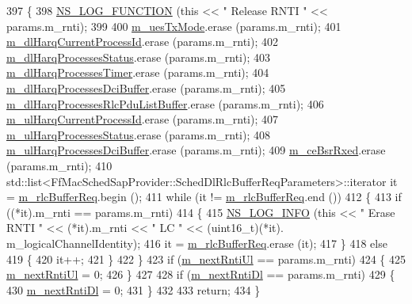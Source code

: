 \begin{DoxyCode}
397 \{
398   \hyperlink{log-macros-disabled_8h_a90b90d5bad1f39cb1b64923ea94c0761}{NS\_LOG\_FUNCTION} (\textcolor{keyword}{this} << \textcolor{stringliteral}{" Release RNTI "} << params.m\_rnti);
399   
400   \hyperlink{classns3_1_1RrFfMacScheduler_acaf305dd7717f4ced31f1dfc07df68ea}{m\_uesTxMode}.erase (params.m\_rnti);
401   \hyperlink{classns3_1_1RrFfMacScheduler_a1e8b17ba5e424b3d11c217b32c41faac}{m\_dlHarqCurrentProcessId}.erase (params.m\_rnti);
402   \hyperlink{classns3_1_1RrFfMacScheduler_aa3d12b5abcb9afeea093150a6572aaed}{m\_dlHarqProcessesStatus}.erase  (params.m\_rnti);
403   \hyperlink{classns3_1_1RrFfMacScheduler_ab5040cff67dad6c8fdfc9c32c90916df}{m\_dlHarqProcessesTimer}.erase (params.m\_rnti);
404   \hyperlink{classns3_1_1RrFfMacScheduler_a6611390f9589d1df0b0f4c0932219eeb}{m\_dlHarqProcessesDciBuffer}.erase  (params.m\_rnti);
405   \hyperlink{classns3_1_1RrFfMacScheduler_a2a6afd0a7df7a71c20382176f6cc9573}{m\_dlHarqProcessesRlcPduListBuffer}.erase  (params.m\_rnti);
406   \hyperlink{classns3_1_1RrFfMacScheduler_ad7674f8cb560202bc36a792f7b2755ca}{m\_ulHarqCurrentProcessId}.erase  (params.m\_rnti);
407   \hyperlink{classns3_1_1RrFfMacScheduler_a13fbe24878639869771e77ff813373ff}{m\_ulHarqProcessesStatus}.erase  (params.m\_rnti);
408   \hyperlink{classns3_1_1RrFfMacScheduler_a530849c4c8d3d5b0796e6af3d8d95173}{m\_ulHarqProcessesDciBuffer}.erase  (params.m\_rnti);
409   \hyperlink{classns3_1_1RrFfMacScheduler_a1696bc07e1fdc0336106223f97b44298}{m\_ceBsrRxed}.erase (params.m\_rnti);
410   std::list<FfMacSchedSapProvider::SchedDlRlcBufferReqParameters>::iterator it = 
      \hyperlink{classns3_1_1RrFfMacScheduler_a25a4bfbb928e22dc026209de004b90fd}{m\_rlcBufferReq}.begin ();
411   \textcolor{keywordflow}{while} (it != \hyperlink{classns3_1_1RrFfMacScheduler_a25a4bfbb928e22dc026209de004b90fd}{m\_rlcBufferReq}.end ())
412     \{
413       \textcolor{keywordflow}{if} ((*it).m\_rnti == params.m\_rnti)
414         \{
415           \hyperlink{group__logging_gafbd73ee2cf9f26b319f49086d8e860fb}{NS\_LOG\_INFO} (\textcolor{keyword}{this} << \textcolor{stringliteral}{" Erase RNTI "} << (*it).m\_rnti << \textcolor{stringliteral}{" LC "} << (uint16\_t)(*it).
      m\_logicalChannelIdentity);
416           it = \hyperlink{classns3_1_1RrFfMacScheduler_a25a4bfbb928e22dc026209de004b90fd}{m\_rlcBufferReq}.erase (it);
417         \}
418       \textcolor{keywordflow}{else}
419         \{
420           it++;
421         \}
422     \}
423   \textcolor{keywordflow}{if} (\hyperlink{classns3_1_1RrFfMacScheduler_afd1cdb17c29e2a04980e4bea7d537e0f}{m\_nextRntiUl} == params.m\_rnti)
424     \{
425       \hyperlink{classns3_1_1RrFfMacScheduler_afd1cdb17c29e2a04980e4bea7d537e0f}{m\_nextRntiUl} = 0;
426     \}
427 
428   \textcolor{keywordflow}{if} (\hyperlink{classns3_1_1RrFfMacScheduler_a7c5404bfe1ef2446a6e920a9d80a8f51}{m\_nextRntiDl} == params.m\_rnti)
429     \{
430       \hyperlink{classns3_1_1RrFfMacScheduler_a7c5404bfe1ef2446a6e920a9d80a8f51}{m\_nextRntiDl} = 0;
431     \}
432     
433   \textcolor{keywordflow}{return};
434 \}
\end{DoxyCode}


